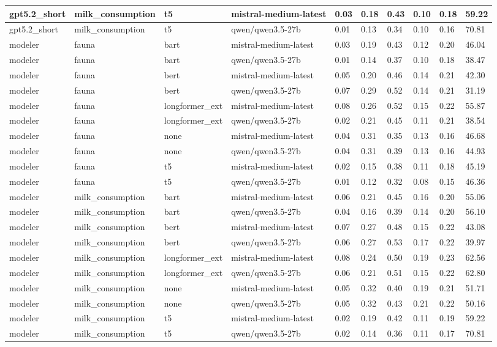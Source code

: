 \begin{tabular}{|l|l|l|l|l|l|l|l|l|l|}
 \hline
 gpt5.2\_short & milk\_consumption & t5 & mistral-medium-latest & 0.03 & 0.18 & 0.43 & 0.10 & 0.18 & 59.22 \\
 \hline
 gpt5.2\_short & milk\_consumption & t5 & qwen/qwen3.5-27b & 0.01 & 0.13 & 0.34 & 0.10 & 0.16 & 70.81 \\
 \hline
 modeler & fauna & bart & mistral-medium-latest & 0.03 & 0.19 & 0.43 & 0.12 & 0.20 & 46.04 \\
 \hline
 modeler & fauna & bart & qwen/qwen3.5-27b & 0.01 & 0.14 & 0.37 & 0.10 & 0.18 & 38.47 \\
 \hline
 modeler & fauna & bert & mistral-medium-latest & 0.05 & 0.20 & 0.46 & 0.14 & 0.21 & 42.30 \\
 \hline
 modeler & fauna & bert & qwen/qwen3.5-27b & 0.07 & 0.29 & 0.52 & 0.14 & 0.21 & 31.19 \\
 \hline
 modeler & fauna & longformer\_ext & mistral-medium-latest & 0.08 & 0.26 & 0.52 & 0.15 & 0.22 & 55.87 \\
 \hline
 modeler & fauna & longformer\_ext & qwen/qwen3.5-27b & 0.02 & 0.21 & 0.45 & 0.11 & 0.21 & 38.54 \\
 \hline
 modeler & fauna & none & mistral-medium-latest & 0.04 & 0.31 & 0.35 & 0.13 & 0.16 & 46.68 \\
 \hline
 modeler & fauna & none & qwen/qwen3.5-27b & 0.04 & 0.31 & 0.39 & 0.13 & 0.16 & 44.93 \\
 \hline
 modeler & fauna & t5 & mistral-medium-latest & 0.02 & 0.15 & 0.38 & 0.11 & 0.18 & 45.19 \\
 \hline
 modeler & fauna & t5 & qwen/qwen3.5-27b & 0.01 & 0.12 & 0.32 & 0.08 & 0.15 & 46.36 \\
 \hline
 modeler & milk\_consumption & bart & mistral-medium-latest & 0.06 & 0.21 & 0.45 & 0.16 & 0.20 & 55.06 \\
 \hline
 modeler & milk\_consumption & bart & qwen/qwen3.5-27b & 0.04 & 0.16 & 0.39 & 0.14 & 0.20 & 56.10 \\
 \hline
 modeler & milk\_consumption & bert & mistral-medium-latest & 0.07 & 0.27 & 0.48 & 0.15 & 0.22 & 43.08 \\
 \hline
 modeler & milk\_consumption & bert & qwen/qwen3.5-27b & 0.06 & 0.27 & 0.53 & 0.17 & 0.22 & 39.97 \\
 \hline
 modeler & milk\_consumption & longformer\_ext & mistral-medium-latest & 0.08 & 0.24 & 0.50 & 0.19 & 0.23 & 62.56 \\
 \hline
 modeler & milk\_consumption & longformer\_ext & qwen/qwen3.5-27b & 0.06 & 0.21 & 0.51 & 0.15 & 0.22 & 62.80 \\
 \hline
 modeler & milk\_consumption & none & mistral-medium-latest & 0.05 & 0.32 & 0.40 & 0.19 & 0.21 & 51.71 \\
 \hline
 modeler & milk\_consumption & none & qwen/qwen3.5-27b & 0.05 & 0.32 & 0.43 & 0.21 & 0.22 & 50.16 \\
 \hline
 modeler & milk\_consumption & t5 & mistral-medium-latest & 0.02 & 0.19 & 0.42 & 0.11 & 0.19 & 59.22 \\
 \hline
 modeler & milk\_consumption & t5 & qwen/qwen3.5-27b & 0.02 & 0.14 & 0.36 & 0.11 & 0.17 & 70.81 \\
\hline
\end{tabular}
